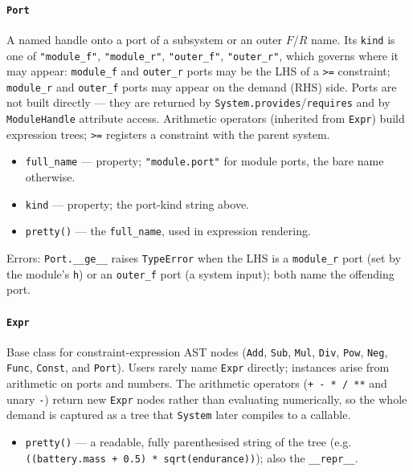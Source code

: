 \documentclass[11pt,a4paper]{article}
\begin{document}
\paragraph{\texttt{Port}}\label{ref:sugar:port}
A named handle onto a port of a subsystem or an outer $F$/$R$ name. Its
\texttt{kind} is one of \texttt{"module\_f"}, \texttt{"module\_r"},
\texttt{"outer\_f"}, \texttt{"outer\_r"}, which governs where it may
appear: \texttt{module\_f} and \texttt{outer\_r} ports may be the LHS of a
\texttt{>=} constraint; \texttt{module\_r} and \texttt{outer\_f} ports may
appear on the demand (RHS) side. Ports are not built directly --- they are
returned by \texttt{System.provides}/\texttt{requires} and by
\texttt{ModuleHandle} attribute access. Arithmetic operators (inherited
from \texttt{Expr}) build expression trees; \texttt{>=} registers a
constraint with the parent system.

\begin{itemize}[nosep]
  \item \texttt{full\_name} --- property; \texttt{"module.port"} for
        module ports, the bare name otherwise.
  \item \texttt{kind} --- property; the port-kind string above.
  \item \texttt{pretty()} --- the \texttt{full\_name}, used in expression
        rendering.
\end{itemize}

Errors: \texttt{Port.\_\_ge\_\_} raises \texttt{TypeError} when the LHS is a
\texttt{module\_r} port (set by the module's \texttt{h}) or an
\texttt{outer\_f} port (a system input); both name the offending port.

\paragraph{\texttt{Expr}}\label{ref:sugar:expr}
Base class for constraint-expression AST nodes (\texttt{Add}, \texttt{Sub},
\texttt{Mul}, \texttt{Div}, \texttt{Pow}, \texttt{Neg}, \texttt{Func},
\texttt{Const}, and \texttt{Port}). Users rarely name \texttt{Expr}
directly; instances arise from arithmetic on ports and numbers. The
arithmetic operators (\texttt{+ - * / **} and unary \texttt{-}) return new
\texttt{Expr} nodes rather than evaluating numerically, so the whole demand
is captured as a tree that \texttt{System} later compiles to a callable.

\begin{itemize}[nosep]
  \item \texttt{pretty()} --- a readable, fully parenthesised string of the
        tree (e.g. \texttt{((battery.mass + 0.5) * sqrt(endurance))}); also
        the \texttt{\_\_repr\_\_}.
\end{itemize}
\end{document}
